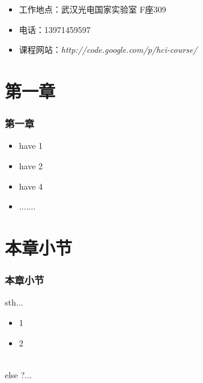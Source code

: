 \documentclass{beamer}
\begin{document}
\begin{frame}
\begin{columns}
	\end{columns}
	\begin{itemize}
		\item \small{工作地点：武汉光电国家实验室 F座309}
		\item \small{电话：13971459597}
		\item \small{课程网站：\textit{http://code.google.com/p/hci-course/}}
	\end{itemize}
\end{frame}

\section{第一章}
 
\begin{frame}
	\frametitle{第一章}
	\begin{itemize}[<+-|alert@+>]
		\item have 1
		\item have 2
		\item have 4
		\item .......
	\end{itemize}
\end{frame}
 
\section{本章小节}
\begin{frame}
	\frametitle{本章小节}
	sth...
	\begin{itemize}[<+-|alert@+>]
		\item 1
		\item 2
	\end{itemize} 
	\hfill \\
	else ?...
\end{frame}
 
\end{document}

